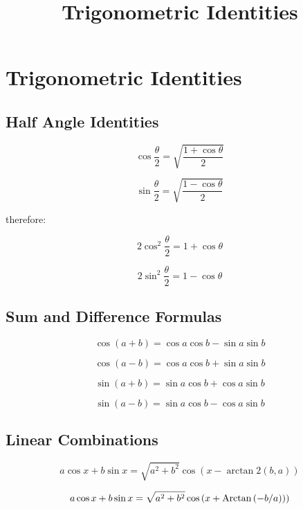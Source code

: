 \documentclass{article}
\title{Trigonometric Identities}
\begin{document}
\section{Trigonometric Identities}

\subsection{Half Angle Identities}

\[ \cos{\frac{\theta}{2}} = \sqrt{\frac{1 + \cos{\theta}}{2}} \]

\[ \sin{\frac{\theta}{2}} = \sqrt{\frac{1 - \cos{\theta}}{2}} \]

therefore:

\[ 2\cos^2{\frac{\theta}{2}} = 1 + \cos{\theta} \]

\[ 2\sin^2{\frac{\theta}{2}} = 1 - \cos{\theta} \]

\subsection{Sum and Difference Formulas}

\[ \cos{(a + b)} = \cos{a}\cos{b}-\sin{a}\sin{b} \]

\[ \cos{(a - b)} = \cos{a}\cos{b}+\sin{a}\sin{b} \]

\[ \sin{(a + b)} = \sin{a}\cos{b}+\cos{a}\sin{b} \]

\[ \sin{(a - b)} = \sin{a}\cos{b}-\cos{a}\sin{b} \]

\subsection{Linear Combinations}

\[ a \cos x + b \sin x = \sqrt{a^2 + b^2} \cos{(x - \arctan2{(b, a)})} \]

\[ a \cos x + b \sin x = \sqrt{a^2 + b^2} \cos{(x + \operatorname{Arctan}{(-b/a))})} \]
\end{document}
